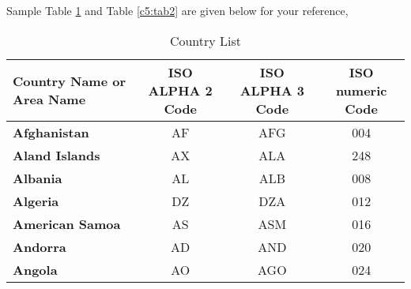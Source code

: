 Sample Table \ref{c5:tab1} and Table \ref{c5:tab2} are given below  for your reference,

\begin{table}[htb]
\fontsize{10}{12}\selectfont
\caption{Country List}
\label{c5:tab1}
\begin{tabular}{|p{3cm}|c|c|c|}
	\hline
	\textbf{Country Name     or Area Name}& \textbf {ISO ALPHA 2 Code} & \textbf {ISO ALPHA 3 Code} & \textbf{ISO numeric Code}\\
	\hline
	\textbf{Afghanistan}   & AF    & AFG &   004\\\hline
	\textbf{Aland Islands}&   AX  & ALA   & 248\\\hline
	\textbf{Albania} & AL & ALB&  008\\\hline
	\textbf{Algeria}    &DZ & DZA&  012\\\hline
	\textbf{American Samoa}&   AS  & ASM&016\\\hline
	\textbf{Andorra}& AD  & AND   & 020\\\hline
	\textbf{Angola}& AO  & AGO& 024\\
	\hline
\end{tabular}
\end{table}



